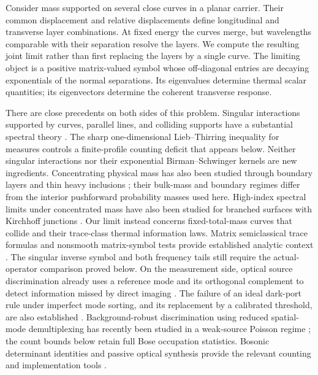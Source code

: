 \documentclass[aps,pra,reprint,superscriptaddress,longbibliography]{revtex4-2}
\begin{document}
Consider mass supported on several close curves in a planar carrier.
Their common displacement and relative displacements define longitudinal
and transverse layer combinations. At fixed energy the curves merge,
but wavelengths comparable with their separation resolve the layers.
We compute the resulting joint limit rather than first replacing the
layers by a single curve. The limiting object is a positive matrix-valued
symbol whose off-diagonal entries are decaying exponentials of the
normal separations. Its eigenvalues determine thermal scalar quantities;
its eigenvectors determine the coherent transverse response.

There are close precedents on both sides of this problem. Singular
interactions supported by curves, parallel lines, and colliding supports
have a substantial spectral theory
\cite{KondejKrejcirik2013,KondejKrejcirik2016}. The sharp
one-dimensional Lieb--Thirring inequality for measures
\cite{HundertmarkLiebThomas1998} controls a finite-profile counting
deficit that appears below. Neither singular interactions nor their
exponential Birman--Schwinger kernels are new ingredients. Concentrating
physical mass has also been studied through boundary layers and thin
heavy inclusions \cite{DallaRivaProvenzano2018,Golovaty2022}; their
bulk-mass and boundary regimes differ from the interior pushforward
probability masses used here.
High-index spectral limits under concentrated mass have also been studied
for branched surfaces with Kirchhoff junctions
\cite{GolovatyGomezPerezMartinez2025}. Our limit instead concerns
fixed-total-mass curves that collide and their trace-class thermal
information laws. Matrix semiclassical trace formulas and
nonsmooth matrix-symbol tests provide established analytic context
\cite{AssalDimassiFujii2019,Kuster2017,BollmannMuller2024}.
The singular inverse symbol and both frequency tails still require
the actual-operator comparison proved below. On the
measurement side, optical source discrimination already uses a reference
mode and its orthogonal complement to detect information missed by
direct imaging \cite{Lu2018}. The failure of an ideal dark-port rule
under imperfect mode sorting, and its replacement by a calibrated
threshold, are also established \cite{Schlichtholz2024}.
Background-robust discrimination using reduced spatial-mode
demultiplexing has recently been studied in a weak-source Poisson
regime \cite{Liu2026}; the count bounds below retain full Bose
occupation statistics. Bosonic
determinant identities and passive optical synthesis provide the relevant
counting and implementation tools \cite{Klich2002,Clements2016}.
\end{document}
